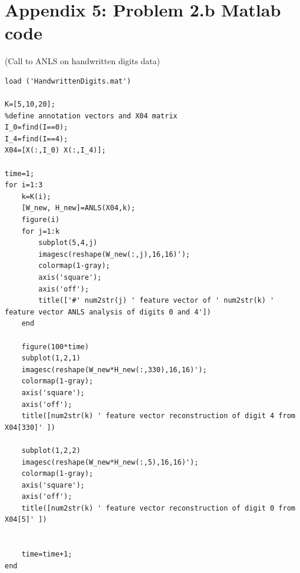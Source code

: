 \documentclass{article}
\begin{document}
\section*{Appendix 5: Problem 2.b Matlab code}(Call to ANLS on handwritten digits data)
\begin{verbatim}
load ('HandwrittenDigits.mat')

K=[5,10,20];
%define annotation vectors and X04 matrix
I_0=find(I==0);
I_4=find(I==4);
X04=[X(:,I_0) X(:,I_4)];

time=1;
for i=1:3
    k=K(i);
    [W_new, H_new]=ANLS(X04,k);
    figure(i)
    for j=1:k
        subplot(5,4,j)
        imagesc(reshape(W_new(:,j),16,16)');
        colormap(1-gray);
        axis('square');
        axis('off');
        title(['#' num2str(j) ' feature vector of ' num2str(k) ' feature vector ANLS analysis of digits 0 and 4'])
    end
    
    figure(100*time)
    subplot(1,2,1)
    imagesc(reshape(W_new*H_new(:,330),16,16)');
    colormap(1-gray);
    axis('square');
    axis('off');
    title([num2str(k) ' feature vector reconstruction of digit 4 from X04[330]' ])
    
    subplot(1,2,2)
    imagesc(reshape(W_new*H_new(:,5),16,16)');
    colormap(1-gray);
    axis('square');
    axis('off');
    title([num2str(k) ' feature vector reconstruction of digit 0 from X04[5]' ])
    
    
    time=time+1;
end
\end{verbatim}
\end{document}
